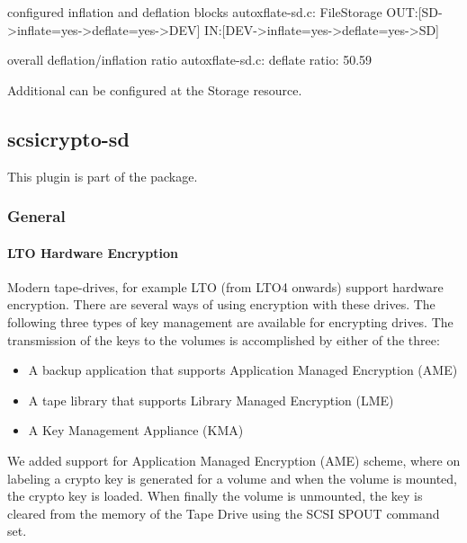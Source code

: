 \begin{bmessage}{configured inflation and deflation blocks}
autoxflate-sd.c: FileStorage OUT:[SD->inflate=yes->deflate=yes->DEV] IN:[DEV->inflate=yes->deflate=yes->SD]
\end{bmessage}

\begin{bmessage}{overall deflation/inflation ratio}
autoxflate-sd.c: deflate ratio: 50.59%
\end{bmessage}

Additional  can be configured at the Storage resource.


\subsection{scsicrypto-sd}

This plugin is part of the  package.

\subsubsection{General}

\paragraph{LTO Hardware Encryption}
\label{LTOHardwareEncryptionGeneral}

Modern tape-drives, for example LTO (from LTO4 onwards) support hardware encryption.
There are several ways of using encryption with these drives. The following three types of key management are available for encrypting drives. The transmission of the keys to the volumes is accomplished by either of the three:

\begin{itemize}
 \item A backup application that supports Application Managed Encryption (AME)
 \item A tape library that supports Library Managed Encryption (LME)
 \item A Key Management Appliance (KMA)
\end{itemize}

We added support for Application Managed Encryption (AME) scheme, where on labeling a crypto key is generated for a volume and when the volume is mounted, the crypto key is loaded. When finally the volume is unmounted, the key is cleared from the memory of the Tape Drive using the SCSI SPOUT command set.

